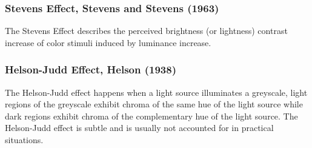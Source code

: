 \subsubsection{Stevens Effect, Stevens and Stevens (1963)}%
\label{subsubsec:stevens-effect-stevens-and-stevens-1963}

The Stevens Effect describes the perceived brightness (or lightness) contrast increase of color stimuli induced by luminance increase.

\subsubsection{Helson-Judd Effect, Helson (1938)}%
\label{subsubsec:helson-judd-effect-helson-1938}

The Helson-Judd effect happens when a light source illuminates a greyscale, light regions of the greyscale exhibit chroma of the same hue of the light source while dark regions exhibit chroma of the complementary hue of the light source. The Helson-Judd effect is subtle and is usually not accounted for in practical situations.

